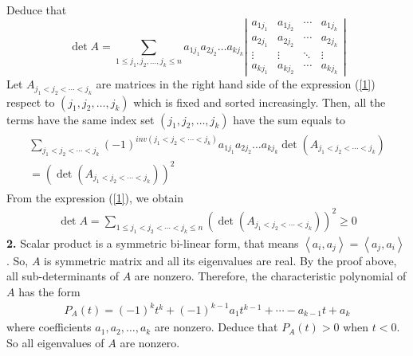 \documentclass{article}
\begin{document}
Deduce that 
\begin{equation}
	\label{1}
	\det A = \sum\limits_{1 \le {j_1},{j_2}, \ldots ,{j_k} \le n} {{a_{1{j_1}}}{a_{2{j_2}}} \ldots {a_{k{j_k}}}} \left| {\begin{array}{*{20}{c}}
			{{a_{1{j_1}}}}&{{a_{1{j_2}}}}& \cdots &{{a_{1{j_k}}}}\\
			{{a_{2{j_1}}}}&{{a_{2{j_2}}}}& \cdots &{{a_{2{j_k}}}}\\
			\vdots & \vdots & \ddots & \vdots \\
			{{a_{k{j_1}}}}&{{a_{k{j_2}}}}& \cdots &{{a_{k{j_k}}}}
	\end{array}} \right|
\end{equation}
Let ${A_{{j_1} < {j_2} <  \cdots  < {j_k}}}$ are matrices in the right hand side of the expression (\ref{1}) respect to $\left( {{j_1},{j_2}, \ldots ,{j_k}} \right)$ which is fixed and sorted increasingly. Then, all the terms have the same index set $\left( {{j_1},{j_2}, \ldots ,{j_k}} \right)$ have the sum equals to
\begin{align}
	\begin{array}{l}
		\sum\limits_{{j_1} < {j_2} <  \cdots  < {j_k}} {{{\left( { - 1} \right)}^{inv\left( {{j_1} < {j_2} <  \cdots  < {j_k}} \right)}}{a_{1{j_1}}}{a_{2{j_2}}} \ldots {a_{k{j_k}}}\det \left( {{A_{{j_1} < {j_2} <  \cdots  < {j_k}}}} \right)} \\
		= {\left( {\det \left( {{A_{{j_1} < {j_2} <  \cdots  < {j_k}}}} \right)} \right)^2}
	\end{array}
\end{align}
From the expression (\ref{1}), we obtain 
\begin{align}
	\det A = \sum\limits_{1 \le {j_1} < {j_2} <  \cdots  < {j_k} \le n} {{{\left( {\det \left( {{A_{{j_1} < {j_2} <  \cdots  < {j_k}}}} \right)} \right)}^2}}  \ge 0
\end{align}
\textbf{2.} Scalar product is a symmetric bi-linear form, that means $\left\langle {{a_i},{a_j}} \right\rangle  = \left\langle {{a_j},{a_i}} \right\rangle $. So, $A$ is symmetric matrix and all its eigenvalues are real. By the proof above, all sub-determinants of $A$ are nonzero. Therefore, the characteristic polynomial of $A$ has the form
\begin{align}
	{P_A}\left( t \right) = {\left( { - 1} \right)^k}{t^k} + {\left( { - 1} \right)^{k - 1}}{a_1}{t^{k - 1}} +  \cdots  - {a_{k - 1}}t + {a_k}
\end{align}
where coefficients ${a_1},{a_2}, \ldots ,{a_k}$ are nonzero. Deduce that ${P_A}\left( t \right) > 0$ when $t<0$. So all eigenvalues of $A$ are nonzero.
\end{document}
